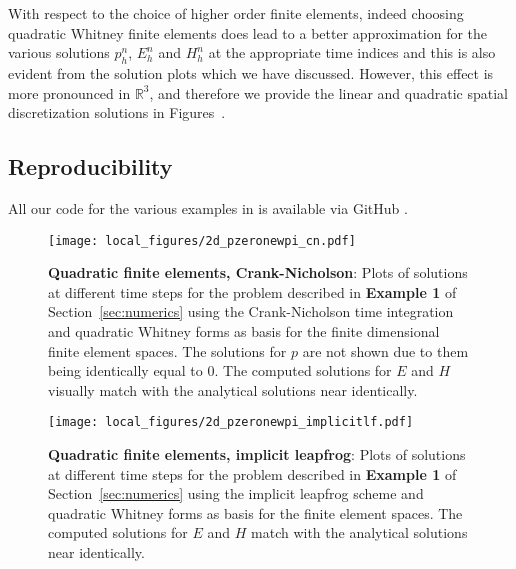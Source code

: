 \documentclass{amsart}
\theoremstyle{thmstyleone}%
\theoremstyle{thmstyletwo}%
\theoremstyle{thmstylethree}%
\def\R{\mathbb{R}}
\begin{document}
With respect to the choice of higher order finite elements, indeed choosing quadratic Whitney finite elements does lead to a better approximation for the various solutions $p_h^n$, $E_h^n$ and $H_h^n$ at the appropriate time indices and this is also evident from the solution plots which we have discussed. However, this effect is more pronounced in $\R^3$, and therefore we provide the linear and quadratic spatial discretization solutions in Figures~.

\subsection{Reproducibility} All our code for the various examples in  is available via GitHub \cite{ArKa2024}.


\vspace*{\fill}
\begin{figure}[h]
  \centering
  \texttt{[image: local\_figures/2d\_pzeronewpi\_cn.pdf]}
  \caption{\textbf{Quadratic finite elements, Crank-Nicholson}: Plots of solutions at different time steps for the problem described in \textbf{Example 1} of Section~\ref{sec:numerics} using the Crank-Nicholson time integration and quadratic Whitney forms as basis for the finite dimensional finite element spaces. The solutions for $p$ are not shown due to them being identically equal to $0$. The computed solutions for $E$ and $H$ visually match with the analytical solutions near identically.}
  \label{fig:example1_cn}
\end{figure}
\vspace{\fill}
\clearpage

\vspace*{\fill}
\begin{figure}[h]
  \centering
  \texttt{[image: local\_figures/2d\_pzeronewpi\_implicitlf.pdf]}  
  \caption{\textbf{Quadratic finite elements, implicit leapfrog}: Plots of solutions at different time steps for the problem described in \textbf{Example 1} of Section~\ref{sec:numerics} using the implicit leapfrog scheme and quadratic Whitney forms as basis for the finite element spaces. The computed solutions for $E$ and $H$ match with the analytical solutions near identically.}
  \label{fig:example1_lf}
\end{figure}
\vspace{\fill}
\clearpage
\end{document}
